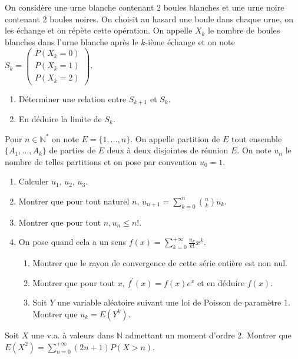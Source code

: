 \begin{exercice}
On considère une urne blanche contenant 2 boules blanches et une urne noire contenant 2 boules noires. On choisit au hasard une boule dans chaque urne, on les échange et on répète cette opération. On appelle $X_{k}$ le nombre de boules blanches dans l'urne blanche après le $k$-ième échange et on note $S_{k}=\begin{pmatrix} P(X_{k}=0) \\ P(X_{k}=1) \\ P(X_{k}=2) \end{pmatrix}$.
\begin{enumerate}
    \item Déterminer une relation entre $S_{k+1}$ et $S_{k}$.
    \item En déduire la limite de $S_{k}$.
\end{enumerate}
\end{exercice}

\begin{exercice}
Pour $n\in\mathbb{N}^{*}$ on note $E=\{1,\dots,n\}$. On appelle partition de $E$ tout ensemble $\{A_{1},\dots,A_{k}\}$ de parties de $E$ deux à deux disjointes de réunion $E$.
On note $u_{n}$ le nombre de telles partitions et on pose par convention $u_{0}=1$.
\begin{enumerate}
    \item Calculer $u_{1}$, $u_{2}$, $u_{3}$.
    \item Montrer que pour tout naturel $n$, $u_{n+1}=\sum_{k=0}^{n}\binom{n}{k}u_{k}$.
    \item Montrer que pour tout $n, u_{n}\le n!$.
    \item On pose quand cela a un sens $f(x)=\sum_{k=0}^{+ \infty}\frac{u_{k}}{k!}x^{k}$.
    \begin{enumerate}
        \item Montrer que le rayon de convergence de cette série entière est non nul.
        \item Montrer que pour tout $x$, $f^{\prime}(x)=f(x)e^{x}$ et en déduire $f(x)$.
        \item Soit $Y$ une variable aléatoire suivant une loi de Poisson de paramètre 1. Montrer que $u_{k}=E(Y^{k})$.
    \end{enumerate}
\end{enumerate}
\end{exercice}

\begin{exercice}
Soit $X$ une v.a. à valeurs dans $\mathbb{N}$ admettant un moment d'ordre 2. Montrer que $E(X^{2})=\sum_{n=0}^{+ \infty}(2n+1)P(X>n)$.
\end{exercice}

